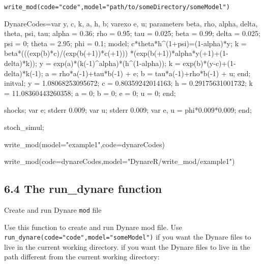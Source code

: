 \documentclass[
  letterpaper,
  DIV=11,
  numbers=noendperiod]{scrartcl}
\newenvironment{Shaded}{\begin{snugshade}}{\end{snugshade}}
\newcommand{\AttributeTok}[1]{\textcolor[rgb]{0.40,0.45,0.13}{#1}}
\newcommand{\FunctionTok}[1]{\textcolor[rgb]{0.28,0.35,0.67}{#1}}
\newcommand{\NormalTok}[1]{\textcolor[rgb]{0.00,0.23,0.31}{#1}}
\newcommand{\OtherTok}[1]{\textcolor[rgb]{0.00,0.23,0.31}{#1}}
\newcommand{\StringTok}[1]{\textcolor[rgb]{0.13,0.47,0.30}{#1}}
\begin{document}
\texttt{write\_mod(code="code",model="path/to/someDirectory/someModel")}

\begin{Shaded}
\begin{Highlighting}[]
\NormalTok{DynareCodes}\OtherTok{=}\StringTok{\textquotesingle{}var y, c, k, a, h, b;}
\StringTok{varexo e, u;}
\StringTok{parameters beta, rho, alpha, delta, theta, psi, tau;}
\StringTok{alpha = 0.36;}
\StringTok{rho   = 0.95;}
\StringTok{tau   = 0.025;}
\StringTok{beta  = 0.99;}
\StringTok{delta = 0.025;}
\StringTok{psi   = 0;}
\StringTok{theta = 2.95;}
\StringTok{phi   = 0.1;}
\StringTok{model;}
\StringTok{c*theta*h\^{}(1+psi)=(1{-}alpha)*y;}
\StringTok{k = beta*(((exp(b)*c)/(exp(b(+1))*c(+1)))}
\StringTok{          *(exp(b(+1))*alpha*y(+1)+(1{-}delta)*k));}
\StringTok{y = exp(a)*(k({-}1)\^{}alpha)*(h\^{}(1{-}alpha));}
\StringTok{k = exp(b)*(y{-}c)+(1{-}delta)*k({-}1);}
\StringTok{a = rho*a({-}1)+tau*b({-}1) + e;}
\StringTok{b = tau*a({-}1)+rho*b({-}1) + u;}
\StringTok{end;}
\StringTok{initval;}
\StringTok{y = 1.08068253095672;}
\StringTok{c = 0.80359242014163;}
\StringTok{h = 0.29175631001732;}
\StringTok{k = 11.08360443260358;}
\StringTok{a = 0;}
\StringTok{b = 0;}
\StringTok{e = 0;}
\StringTok{u = 0;}
\StringTok{end;}

\StringTok{shocks;}
\StringTok{var e; stderr 0.009;}
\StringTok{var u; stderr 0.009;}
\StringTok{var e, u = phi*0.009*0.009;}
\StringTok{end;}

\StringTok{stoch\_simul;\textquotesingle{}}


\FunctionTok{write\_mod}\NormalTok{(}\AttributeTok{model=}\StringTok{"example1"}\NormalTok{,}\AttributeTok{code=}\NormalTok{dynareCodes)}

\FunctionTok{write\_mod}\NormalTok{(}\AttributeTok{code=}\NormalTok{dynareCodes,}\AttributeTok{model=}\StringTok{"DynareR/write\_mod/example1"}\NormalTok{)}
\end{Highlighting}
\end{Shaded}

\hypertarget{the-run_dynare-function}{%
\subsection{6.4 The run\_dynare
function}\label{the-run_dynare-function}}

Create and run Dynare \texttt{mod} file

Use this function to create and run Dynare mod file. Use
\texttt{run\_dynare(code="code",model="someModel")} if you want the
Dynare files to live in the current working directory. if you want the
Dynare files to live in the path different from the current working
directory:
\end{document}
